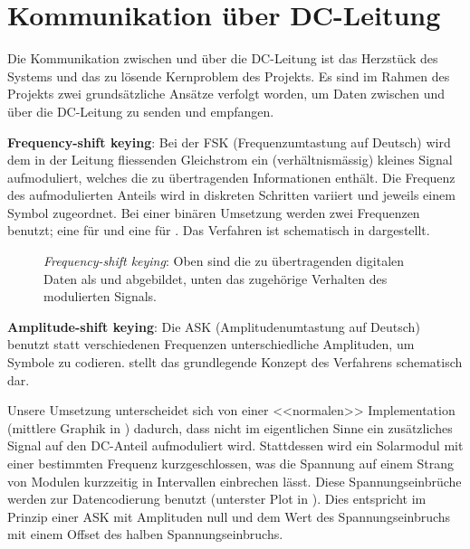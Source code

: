 \clearpage
\section{Kommunikation \"uber DC-Leitung}
\label{sec:commDCLine}

Die Kommunikation zwischen  \Sensor und \Master \"uber die  DC-Leitung ist das
Herzst\"uck des Systems und das zu l\"osende Kernproblem des Projekts. Es sind
im Rahmen  des Projekts  zwei grunds\"atzliche  Ans\"atze verfolgt  worden, um
Daten  zwischen  \Sensor und  \Master  \"uber  die  DC-Leitung zu  senden  und
empfangen.

\textbf{Frequency-shift keying}: Bei  der FSK (Frequenzumtastung  auf Deutsch)
wird  dem in  der Leitung  fliessenden Gleichstrom  ein (verh\"altnism\"assig)
kleines  Signal aufmoduliert,  welches  die  zu \"ubertragenden  Informationen
enth\"alt. Die  Frequenz   des  aufmodulierten   Anteils  wird   in  diskreten
Schritten variiert  und jeweils  einem Symbol zugeordnet. Bei  einer bin\"aren
Umsetzung  werden  zwei  Frequenzen  benutzt; eine  f\"ur    und  eine
f\"ur  .   Das  Verfahren ist  schematisch  in  
dargestellt.

\begin{figure}[h!tb]
    \centering
    
    \caption{%
        \emph{Frequency-shift  keying}: Oben   sind  die   zu  \"ubertragenden
        digitalen  Daten  als    und   abgebildet,  unten  das
        zugeh\"orige Verhalten des  modulierten Signals.%
    }
    \label{fig:fsk:concept}
\end{figure}


\textbf{Amplitude-shift  keying}: Die  ASK (Amplitudenumtastung  auf  Deutsch)
benutzt statt verschiedenen Frequenzen unterschiedliche Amplituden, um Symbole
zu  codieren.    stellt  das  grundlegende  Konzept  des
Verfahrens schematisch dar.

Unsere  Umsetzung unterscheidet  sich  von  einer <<normalen>>   Implementation
(mittlere   Graphik  in   )  dadurch,   dass  nicht   im
eigentlichen Sinne  ein zus\"atzliches  Signal auf den  DC-Anteil aufmoduliert
wird. Stattdessen   wird  ein   Solarmodul  mit   einer  bestimmten   Frequenz
kurzgeschlossen,  was die  Spannung auf  einem Strang  von Modulen  kurzzeitig
in  Intervallen  einbrechen  l\"asst. Diese  Spannungseinbr\"uche  werden  zur
Datencodierung  benutzt   (unterster  Plot   in  ). Dies
entspricht  im  Prinzip  einer  ASK  mit Amplituden  null  und  dem  Wert  des
Spannungseinbruchs mit einem Offset des halben Spannungseinbruchs.

